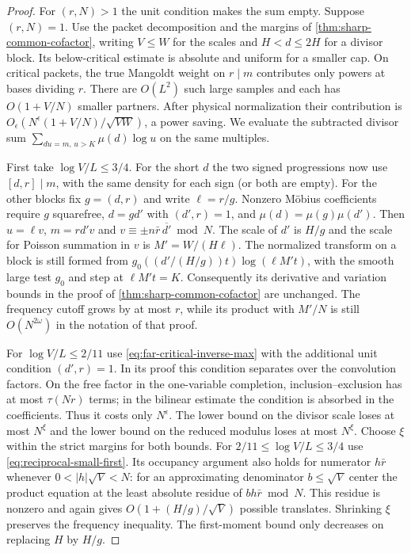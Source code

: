 \documentclass[11pt,a4paper]{article}
\numberwithin{equation}{section}
\begin{document}
\begin{proof}
For $(r,N)>1$ the unit condition makes the sum empty. Suppose
$(r,N)=1$. Use the packet decomposition and the margins of
\cref{thm:sharp-common-cofactor}, writing $V\le W$ for the scales
and $H<d\le2H$ for a divisor block. Its below-critical estimate
is absolute and uniform for a smaller cap. On critical packets,
the true Mangoldt weight on $r\mid m$ contributes only powers at
bases dividing $r$. There are $O(L^2)$ such large samples and
each has $O(1+V/N)$ smaller partners. After physical normalization
their contribution is $O_\epsilon(N^\epsilon(1+V/N)/\sqrt{VW})$,
a power saving. We evaluate the subtracted divisor sum
$\sum_{du=m,\,u>K}\mu(d)\log u$ on the same multiples.

First take $\log V/L\le3/4$. For the short $d$ the two signed
progressions now use $[d,r]\mid m$, with the same density for
each sign (or both are empty). For the other blocks fix
$g=(d,r)$ and write $\ell=r/g$. Nonzero M\"obius coefficients
require $g$ squarefree, $d=gd'$ with $(d',r)=1$, and
$\mu(d)=\mu(g)\mu(d')$. Then $u=\ell v$, $m=rd'v$ and
$v\equiv\pm n\bar r\,\overline{d'}\bmod N$. The scale of
$d'$ is $H/g$ and the scale for Poisson summation in $v$ is
$M'=W/(H\ell)$. The normalized transform on a block is still
formed from $g_0((d'/(H/g))t)\log(\ell M't)$, with the smooth
large test $g_0$ and step at $\ell M't=K$. Consequently its
derivative and variation bounds in the proof of
\cref{thm:sharp-common-cofactor} are unchanged. The frequency
cutoff grows by at most $r$, while its product with $M'/N$
is still $O(N^{2\omega})$ in the notation of that proof.

For $\log V/L\le2/11$ use \eqref{eq:far-critical-inverse-max}
with the additional unit condition $(d',r)=1$. In its proof this
condition separates over the convolution factors. On the free
factor in the one-variable completion, inclusion--exclusion has
at most $\tau(Nr)$ terms; in the bilinear estimate the condition
is absorbed in the coefficients. Thus it costs only $N^\epsilon$.
The lower bound on the divisor scale loses at most $N^\xi$ and
the lower bound on the reduced modulus loses at most $N^\xi$.
Choose $\xi$ within the strict margins for both bounds. For
$2/11\le\log V/L\le3/4$ use \eqref{eq:reciprocal-small-first}.
Its occupancy argument also holds for numerator $h\bar r$
whenever $0<|h|\sqrt V<N$: for an approximating denominator
$b\le\sqrt V$ center the product equation at the least absolute
residue of $bh\bar r\bmod N$. This residue is nonzero and again
gives $O(1+(H/g)/\sqrt V)$ possible translates. Shrinking
$\xi$ preserves the frequency inequality. The first-moment
bound only decreases on replacing $H$ by $H/g$.


\end{proof}
\end{document}
